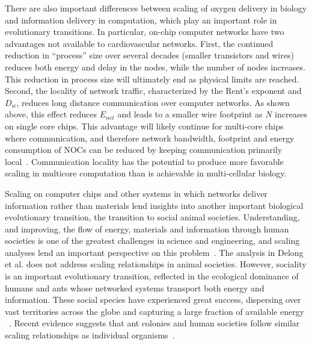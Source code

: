 \documentclass[12pt]{article}
\begin{document}
There are also important differences between scaling of oxygen delivery in biology and information
delivery in computation, which play an important role in evolutionary
transitions. In particular, on-chip computer networks have two advantages not
available to cardiovascular networks.  First, the continued reduction
in ``process'' size over several decades (smaller
transistors and wires)  reduces both energy and
delay in the nodes, while the number of nodes increases.
This reduction in process size will ultimately end
as physical limits are reached. 
Second, the locality of
network traffic, characterized by the Rent's exponent and $D_w$, reduces long
distance communication over computer networks. As shown above, this
effect
reduces $E_{net}$ and leads to a smaller wire footprint as $N$
increases on single core chips. This advantage will likely continue for
multi-core chips where communication, and therefore network bandwidth,
footprint and energy consumption of NOCs can be reduced by keeping
communication primarily local~\cite{bezerra2010modeling, zarkesh2010hybrid}. Communication locality
has the potential to produce more favorable scaling in multicore
computation than is achievable in multi-cellular biology.


Scaling on computer chips and other systems in which networks deliver
information rather than materials lend insights into another important
biological evolutionary transition, the transition to social animal societies. Understanding, and improving, the flow of energy, materials and information through human societies is one of the greatest challenges in science and engineering, and scaling analyses lend an important perspective on this problem~\cite{moses2012beyond}.
The analysis in Delong et al. does not address scaling relationships in animal societies.
However, sociality is an important evolutionary transition, reflected in the
ecological dominance of humans and ants whose networked
systems transport both energy and information. These social species have experienced great success, dispersing over vast territories across the globe and capturing a large
fraction of available energy ~\cite{haberl2007quantifying, holldobler1990ants}. Recent evidence suggests that ant colonies and human societies follow similar scaling relationships as individual organisms~\cite{moses2003allometry, bettencourt2007growth, burnside2012human, hou2010energetic, waters2010allometric}. 
\end{document}
